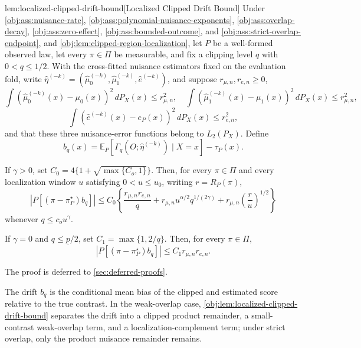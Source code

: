 \documentclass[11pt]{article}
\begin{document}
\begin{lemmav}{lem:localized-clipped-drift-bound}[Localized Clipped Drift Bound]
Under \cref{obj:ass:nuisance-rate}, \cref{obj:ass:polynomial-nuisance-exponents}, \cref{obj:ass:overlap-decay}, \cref{obj:ass:zero-effect}, \cref{obj:ass:bounded-outcome}, and \cref{obj:ass:strict-overlap-endpoint}, and \cref{obj:lem:clipped-region-localization}, let \(P\) be a well-formed observed law, let every \(\pi\in\Pi\) be measurable, and fix a clipping level \(q\) with \(0<q\le 1/2\).  With the cross-fitted nuisance estimators fixed on the evaluation fold, write \(\widehat\eta^{(-k)}=(\widehat\mu_0^{(-k)},\widehat\mu_1^{(-k)},\widehat e^{(-k)})\), and suppose \(r_{\mu,n},r_{e,n}\ge0\),
\[
\int (\widehat\mu_0^{(-k)}(x)-\mu_0(x))^2\,dP_X(x)\le r_{\mu,n}^2,
\quad
\int (\widehat\mu_1^{(-k)}(x)-\mu_1(x))^2\,dP_X(x)\le r_{\mu,n}^2,
\]
\[
\int (\widehat e^{(-k)}(x)-e_P(x))^2\,dP_X(x)\le r_{e,n}^2,
\]
and that these three nuisance-error functions belong to \(L_2(P_X)\).  Define
\[
b_q(x)
=
\mathbb E_P\!\left[\Gamma_q(O;\widehat\eta^{(-k)})\mid X=x\right]
-
\tau_P(x).
\]

If \(\gamma>0\), set \(C_0=4\{1+\sqrt{\max\{C_o,1\}}\}\).  Then, for every \(\pi\in\Pi\) and every localization window \(u\) satisfying \(0<u\le u_0\), writing \(r=R_P(\pi)\),
\[
\left|P\!\left[(\pi-\pi^\star_P)b_q\right]\right|
\le
C_0\left\{
\frac{r_{\mu,n}r_{e,n}}{q}
+
r_{\mu,n}u^{\alpha/2}q^{1/(2\gamma)}
+
r_{\mu,n}\left(\frac{r}{u}\right)^{1/2}
\right\}
\]
whenever \(q\le c_o u^\gamma\).

If \(\gamma=0\) and \(q\le \underline p/2\), set \(C_1=\max\{1,2/q\}\).  Then, for every \(\pi\in\Pi\),
\[
\left|P\!\left[(\pi-\pi^\star_P)b_q\right]\right|
\le
C_1 r_{\mu,n}r_{e,n}.
\]
\end{lemmav}

The proof is deferred to \cref{sec:deferred-proofs}.

The drift \(b_q\) is the conditional mean bias of the clipped and estimated score relative to the true contrast.  In the weak-overlap case, \cref{obj:lem:localized-clipped-drift-bound} separates the drift into a clipped product remainder, a small-contrast weak-overlap term, and a localization-complement term; under strict overlap, only the product nuisance remainder remains.
\end{document}

